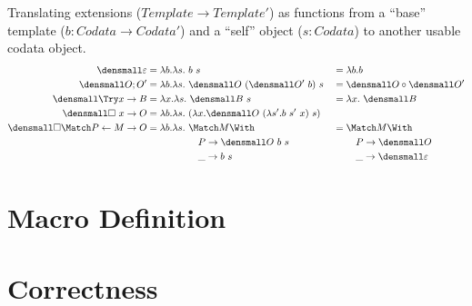 \documentclass[runningheads]{llncs}
\begin{document}
Translating extensions ($Template \to Template'$) as functions from a ``base''
template ($b : Codata \to Codata'$) and a ``self'' object ($s : Codata$) to
another usable codata object.
\begin{align*}
  \den{\varepsilon}
  &=
  \lambda b. \lambda s.~ b ~ s
  &
  &=
  \lambda b. b
  \\
  \den{O; O'}
  &=
  \lambda b. \lambda s.~ \den{O}~(\den{O'}~b) ~ s
  &
  &=
  \den{O} \comp \den{O'}
  \\
  \den{\Try x \to B}
  &=
  \lambda x. \lambda s.~ \den{B} ~ s
  &
  &=
  \lambda x.~ \den{B}
  \\
  \den{\hole ~ x \to O}
  &=
  \lambda b. \lambda s.~(\lambda x. \den{O} ~ (\lambda s'. b ~ s' ~ x) ~ s)
  \\
  \den{\hole \Match P \gets M \to O}
  &=
  \lambda b. \lambda s.~
  \begin{aligned}[t]
    &\Match M \With \\
    &\quad P \to \den{O}~b~s \\
    &\quad \_ \to b ~ s
  \end{aligned}
  &
  &=
  \begin{aligned}[t]
    &\Match M \With \\
    &\quad P \to \den{O} \\
    &\quad \_ \to \den{\varepsilon}
  \end{aligned}
\end{align*}

\section{Macro Definition}

\section{Correctness}
\end{document}
